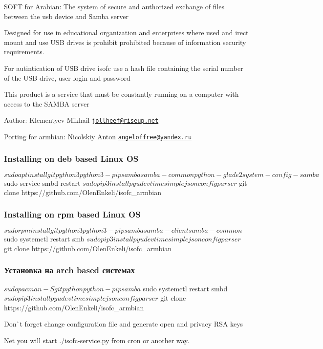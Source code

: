 S\+O\+FT for Arabian\+: The system of secure and authorized exchange of files between the usb device and Samba server

Designed for use in educational organization and enterprises where used and irect mount and use U\+SB drives is prohibit prohibited because of information security requirements.

For autintication of U\+SB drive isofc use a hash file containing the serial number of the U\+SB drive, user login and password

This product is a service that must be constantly running on a computer with access to the S\+A\+M\+BA server

Author\+: Klementyev Mikhail \href{mailto:jollheef@riseup.net}{\tt jollheef@riseup.\+net}

Porting for armbian\+: Nicolskiy Anton \href{mailto:angeloffree@yandex.ru}{\tt angeloffree@yandex.\+ru}

\subsubsection*{Installing on deb based Linux OS}

\begin{DoxyVerb}$ sudo apt install git python3 python3-pip samba samba-common python-glade2 system-config-samba
$ sudo service smbd restart
$ sudo pip3 install pyudev time simplejson configparser
$ git clone https://github.com/OlenEnkeli/isofc_armbian
\end{DoxyVerb}


\subsubsection*{Installing on rpm based Linux OS}

\begin{DoxyVerb}$ sudo rpm install git python3 python3-pip samba samba-client samba-common
$ sudo systemctl restart smb
$ sudo pip3 install pyudev time simplejson configparser
$ git clone https://github.com/OlenEnkeli/isofc_armbian
\end{DoxyVerb}


\subsubsection*{Установка на arch based системах}

\begin{DoxyVerb}$ sudo pacman -S git python python-pip samba
$ sudo systemctl restart smbd
$ sudo pip3 install pyudev time simplejson configparser
$ git clone https://github.com/OlenEnkeli/isofc_armbian
\end{DoxyVerb}


Don\`{}t forget change configuration file and generate open and privacy R\+SA keys

Net you will start ./isofc-\/service.py from cron or another way. 